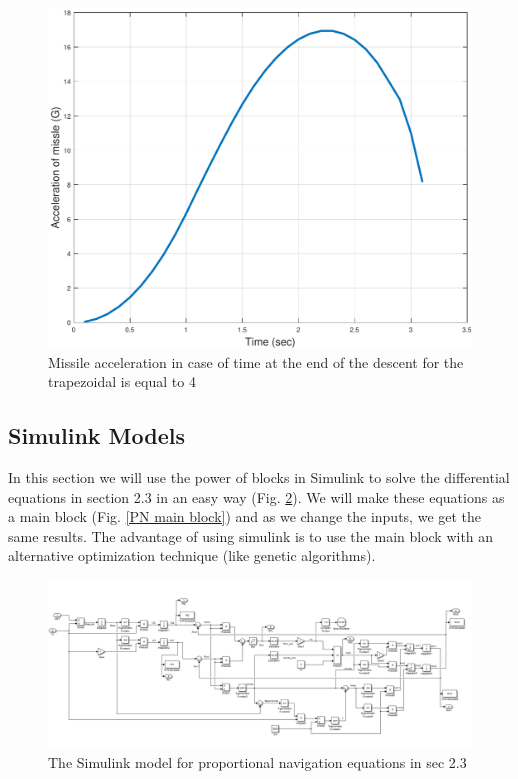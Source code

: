 \begin{figure}[htb]
	\centering
	\includegraphics[scale = 0.75]{fig/MissileAccelerationT3.pdf}
	\caption{Missile acceleration in case of time at the end of the descent for the trapezoidal is equal to 4 }
	\label{missile accelerationT3}
\end{figure}

\subsection{Simulink Models}

In this section we will use the power of blocks in Simulink to solve the differential equations in section 2.3 in an easy way (Fig. \ref{PN eq}). We will make these equations as a main block (Fig. \ref{PN main block}) and as we change the inputs, we get the same results. The advantage of using simulink is to use the main block with an alternative optimization technique (like genetic algorithms). 

\begin{landscape}
\begin{figure}[htb]
	\centering
	\includegraphics[scale = 0.70]{fig/PNeq.PNG}
	\caption{The Simulink model for proportional navigation equations in sec 2.3}
	\label{PN eq}
\end{figure}
\end{landscape}


